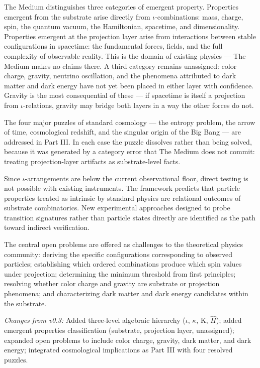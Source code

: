 \documentclass[11pt,letterpaper]{article}
\begin{document}
The Medium distinguishes three categories of emergent property. Properties emergent from the substrate arise directly from \(\iota\)-combinations: mass, charge, spin, the quantum vacuum, the Hamiltonian, spacetime, and dimensionality. Properties emergent at the projection layer arise from interactions between stable configurations in spacetime: the fundamental forces, fields, and the full complexity of observable reality. This is the domain of existing physics --- The Medium makes no claims there. A third category remains unassigned: color charge, gravity, neutrino oscillation, and the phenomena attributed to dark matter and dark energy have not yet been placed in either layer with confidence. Gravity is the most consequential of these --- if spacetime is itself a projection from \(\iota\)-relations, gravity may bridge both layers in a way the other forces do not.

The four major puzzles of standard cosmology --- the entropy problem, the arrow of time, cosmological redshift, and the singular origin of the Big Bang --- are addressed in Part III. In each case the puzzle dissolves rather than being solved, because it was generated by a category error that The Medium does not commit: treating projection-layer artifacts as substrate-level facts.

Since \(\iota\)-arrangements are below the current observational floor, direct testing is not possible with existing instruments. The framework predicts that particle properties treated as intrinsic by standard physics are relational outcomes of substrate combinatorics. New experimental approaches designed to probe transition signatures rather than particle states directly are identified as the path toward indirect verification.

The central open problems are offered as challenges to the theoretical physics community: deriving the specific configurations corresponding to observed particles; establishing which ordered combinations produce which spin values under projection; determining the minimum threshold from first principles; resolving whether color charge and gravity are substrate or projection phenomena; and characterizing dark matter and dark energy candidates within the substrate.

\emph{Changes from v0.3:} Added three-level algebraic hierarchy (\(\iota\), \(\kappa\), K, \(\hat{H}\)); added emergent properties classification (substrate, projection layer, unassigned); expanded open problems to include color charge, gravity, dark matter, and dark energy; integrated cosmological implications as Part III with four resolved puzzles.
\end{document}
